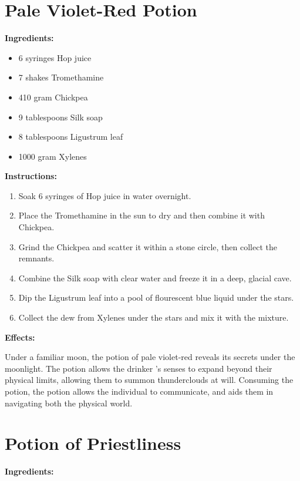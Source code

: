 \documentclass{article}
\begin{document}
\newpage
\section*{Pale Violet-Red Potion}

\textbf{Ingredients:}

\begin{itemize}
  \item 6 syringes Hop juice
  \item 7 shakes Tromethamine
  \item 410 gram Chickpea
  \item 9 tablespoons Silk soap
  \item 8 tablespoons Ligustrum leaf
  \item 1000 gram Xylenes
\end{itemize}

\textbf{Instructions:}

\begin{enumerate}
  \item Soak 6 syringes of Hop juice in water overnight.
  \item Place the Tromethamine in the sun to dry and then combine it with Chickpea.
  \item Grind the Chickpea and scatter it within a stone circle, then collect the remnants.
  \item Combine the Silk soap with clear water and freeze it in a deep, glacial cave.
  \item Dip the Ligustrum leaf into a pool of flourescent blue liquid under the stars.
  \item Collect the dew from Xylenes under the stars and mix it with the mixture.
\end{enumerate}

\textbf{Effects:}

Under a familiar moon, the potion of pale violet-red reveals its secrets under the moonlight. The potion allows the drinker 's senses to expand beyond their physical limits, allowing them to summon thunderclouds at will. Consuming the potion, the potion allows the individual to communicate, and aids them in navigating both the physical world.

\newpage
\section*{Potion of Priestliness}

\textbf{Ingredients:}
\end{document}
